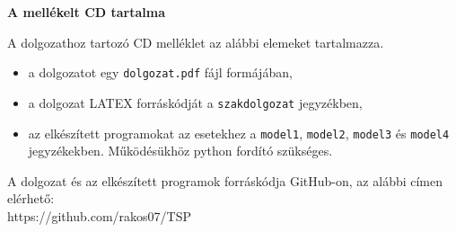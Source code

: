\pagestyle{empty}

\noindent \textbf{\Large A mellékelt CD tartalma}

\vskip 1cm

A dolgozathoz tartozó CD melléklet az alábbi elemeket tartalmazza.
\begin{itemize}
\item a dolgozatot egy \texttt{dolgozat.pdf} fájl formájában,
\item a dolgozat LATEX forráskódját a \texttt{szakdolgozat} jegyzékben,
\item az elkészített programokat az esetekhez a \texttt{model1}, \texttt{model2}, \texttt{model3} és \texttt{model4} jegyzékekben. Működésükhöz python fordító szükséges.
\end{itemize}

A dolgozat és az elkészített programok forráskódja GitHub-on, az alábbi címen elérhető:\\
https://github.com/rakos07/TSP
